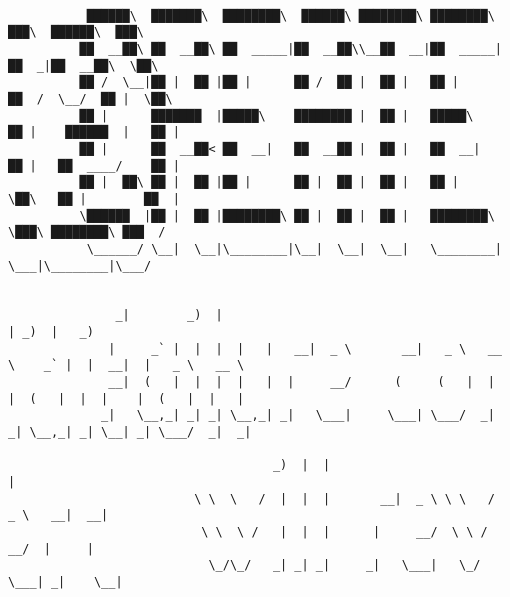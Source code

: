 \documentclass[varwidth=\maxdimen,margin=0.5cm,multi={verbatim}]{standalone}
\begin{document}
\begin{verbatim}

           ██████\  ███████\  ████████\  ██████\ ████████\ ████████\      ███\  ██████\  ███\
          ██  __██\ ██  __██\ ██  _____|██  __██\\__██  __|██  _____|    ██  _|██  __██\  \██\
          ██ /  \__|██ |  ██ |██ |      ██ /  ██ |  ██ |   ██ |         ██  /  \__/  ██ |  \██\
          ██ |      ███████  |█████\    ████████ |  ██ |   █████\       ██ |    ██████  |   ██ |
          ██ |      ██  __██< ██  __|   ██  __██ |  ██ |   ██  __|      ██ |   ██  ____/    ██ |
          ██ |  ██\ ██ |  ██ |██ |      ██ |  ██ |  ██ |   ██ |         \██\   ██ |        ██  |
          \██████  |██ |  ██ |████████\ ██ |  ██ |  ██ |   ████████\     \███\ ████████\ ███  /
           \______/ \__|  \__|\________|\__|  \__|  \__|   \________|      \___|\________|\___/


               _|        _)  |                                                | _)  |   _)
              |     _` |  |  |  |   |   __|  _ \       __|   _ \   __ \    _` |  |  __|  |   _ \   __ \
              __|  (   |  |  |  |   |  |     __/      (     (   |  |   |  (   |  |  |    |  (   |  |   |
             _|   \__,_| _| _| \__,_| _|   \___|     \___| \___/  _|  _| \__,_| _| \__| _| \___/  _|  _|

                                     _)  |  |                                    |
                          \ \  \   /  |  |  |       __|  _ \ \ \   /  _ \   __|  __|
                           \ \  \ /   |  |  |      |     __/  \ \ /   __/  |     |
                            \_/\_/   _| _| _|     _|   \___|   \_/  \___| _|    \__|



\end{verbatim}
\end{document}
